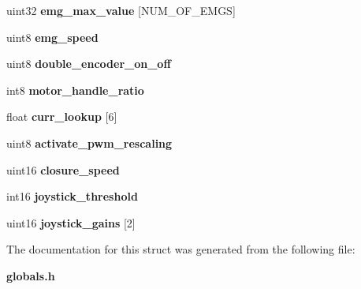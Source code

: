 \begin{DoxyCompactItemize}
uint32 {\bfseries emg\+\_\+max\+\_\+value} [N\+U\+M\+\_\+\+O\+F\+\_\+\+E\+M\+GS]
\item 
\mbox{\label{structst__mem_ae8e800591064bf14eb2dd3a3fb2c325b}} 
uint8 {\bfseries emg\+\_\+speed}
\item 
\mbox{\label{structst__mem_a3d5832272cab9dc9f831471a9634b43e}} 
uint8 {\bfseries double\+\_\+encoder\+\_\+on\+\_\+off}
\item 
\mbox{\label{structst__mem_a098badbb74d31ea6257e57f6d66823cc}} 
int8 {\bfseries motor\+\_\+handle\+\_\+ratio}
\item 
\mbox{\label{structst__mem_ae6985d1612e01946a39d074470dc8e15}} 
float {\bfseries curr\+\_\+lookup} [6]
\item 
\mbox{\label{structst__mem_a53d9d645351f4020826ab8c56c91b244}} 
uint8 {\bfseries activate\+\_\+pwm\+\_\+rescaling}
\item 
\mbox{\label{structst__mem_a8ce5a15edbe6a26aa05c80222f24c439}} 
uint16 {\bfseries closure\+\_\+speed}
\item 
\mbox{\label{structst__mem_ae28d535845c3d16074a1e77297c3f9b8}} 
int16 {\bfseries joystick\+\_\+threshold}
\item 
\mbox{\label{structst__mem_a14cf892a30db1ab3693091b7786f5e7d}} 
uint16 {\bfseries joystick\+\_\+gains} [2]
\end{DoxyCompactItemize}


The documentation for this struct was generated from the following file\+:\begin{DoxyCompactItemize}
\item 
\textbf{ globals.\+h}\end{DoxyCompactItemize}
